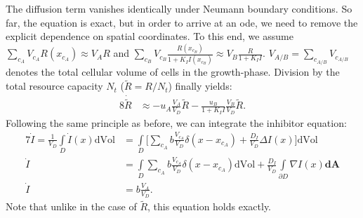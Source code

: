 \documentclass[10pt,1p,authoryear]{elsarticle}
\numberwithin{equation}{section}
\begin{document}
The diffusion term vanishes identically under Neumann boundary conditions. So far, the equation is exact, but in order to arrive at an \ac{ode}, we need to remove the explicit dependence on spatial coordinates. To this end, we assume $\sum\limits_{c_A} V_{c_A}R(x_{c_A})\approx V_AR$ and $\sum\limits_{c_B} V_{c_B}\frac{R(x_{c_B})}{1+K_I I(x_{c_B})}\approx  V_B\frac{R}{1+K_I I}$. $V_{A/B}=\sum_{c_{A/B}} V_{c_{A/B}}$ denotes the total cellular volume of cells in the growth-phase. Division by the total resource capacity $N_t$ ($\tilde{R}=R/N_t$) finally yields:
\begin{alignat}{8}
        \dot{\tilde{R}}&\approx -u_A\frac{V_A}{V_D} \tilde{R} -\frac{u_B}{1+K_I I} \frac{V_B}{V_D} \tilde{R}.
\end{alignat}
Following the same principle as before, we can integrate the inhibitor equation:
\begin{alignat}{7}
   \dot{I}=\frac{1}{V_D}\int\limits_D\dot{I}(x)\text{dVol} &= \int\limits_D \bigg[\sum\limits_{c_A} b  \frac{V_{c_A}}{V_D} \delta(x-x_{c_A}) + \frac{D_I}{V_D} \Delta I(x)\bigg]\text{dVol}\\
   \dot{I} &= \int\limits_D\sum\limits_{c_A} b  \frac{V_{c_A}}{V_D} \delta(x-x_{c_A}) \text{dVol} + \frac{D_I}{V_D}\int\limits_{\partial D} \nabla I(x)\mathbf{\text{dA}}\\
   \dot{I} &= b \frac{V_A}{V_D}.
\end{alignat}
Note that unlike in the case of $\tilde{R}$, this equation holds exactly.
%
\end{document}
